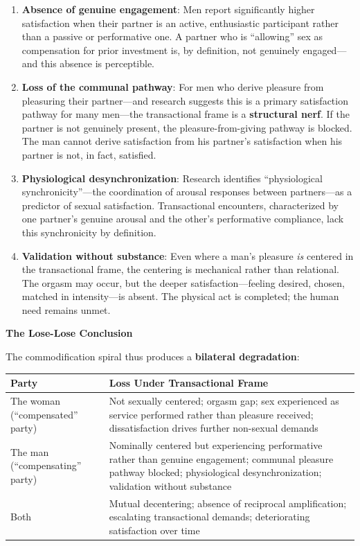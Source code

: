 \documentclass[12pt,openany]{book}
\numberwithin{equation}{chapter}
\begin{document}
\begin{enumerate}
    \item \textbf{Absence of genuine engagement}: Men report significantly higher satisfaction when their partner is an active, enthusiastic participant rather than a passive or performative one. A partner who is ``allowing'' sex as compensation for prior investment is, by definition, not genuinely engaged---and this absence is perceptible.
    
    \item \textbf{Loss of the communal pathway}: For men who derive pleasure from pleasuring their partner---and research suggests this is a primary satisfaction pathway for many men---the transactional frame is a \textbf{structural nerf}. If the partner is not genuinely present, the pleasure-from-giving pathway is blocked. The man cannot derive satisfaction from his partner's satisfaction when his partner is not, in fact, satisfied.
    
    \item \textbf{Physiological desynchronization}: Research identifies ``physiological synchronicity''---the coordination of arousal responses between partners---as a predictor of sexual satisfaction. Transactional encounters, characterized by one partner's genuine arousal and the other's performative compliance, lack this synchronicity by definition.
    
    \item \textbf{Validation without substance}: Even where a man's pleasure \textit{is} centered in the transactional frame, the centering is mechanical rather than relational. The orgasm may occur, but the deeper satisfaction---feeling desired, chosen, matched in intensity---is absent. The physical act is completed; the human need remains unmet.
\end{enumerate}

\textbf{The Lose-Lose Conclusion}

The commodification spiral thus produces a \textbf{bilateral degradation}:

\begin{center}
\begin{tabular}{|p{2.5in}|p{3.5in}|}
\hline
\textbf{Party} & \textbf{Loss Under Transactional Frame} \\
\hline
The woman (``compensated'' party) & Not sexually centered; orgasm gap; sex experienced as service performed rather than pleasure received; dissatisfaction drives further non-sexual demands \\
\hline
The man (``compensating'' party) & Nominally centered but experiencing performative rather than genuine engagement; communal pleasure pathway blocked; physiological desynchronization; validation without substance \\
\hline
Both & Mutual decentering; absence of reciprocal amplification; escalating transactional demands; deteriorating satisfaction over time \\
\hline
\end{tabular}
\end{center}
\end{document}
